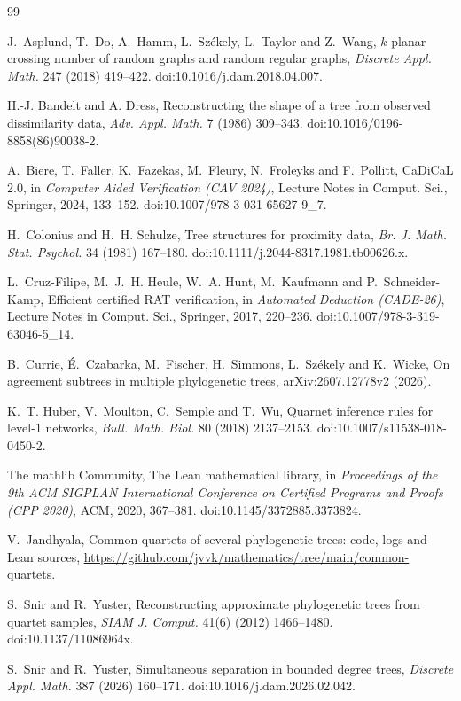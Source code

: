 \documentclass[11pt]{amsart}
\theoremstyle{definition}
\begin{document}
\begin{thebibliography}{99}

 J.~Asplund, T.~Do, A.~Hamm, L.~Sz\'ekely, L.~Taylor and Z.~Wang, $k$-planar crossing number of
random graphs and random regular graphs, \emph{Discrete Appl. Math.} 247 (2018) 419--422.
doi:10.1016/j.dam.2018.04.007.

 H.-J. Bandelt and A. Dress, Reconstructing the shape of a tree from observed dissimilarity data,
\emph{Adv. Appl. Math.} 7 (1986) 309--343. doi:10.1016/0196-8858(86)90038-2.

 A.~Biere, T.~Faller, K.~Fazekas, M.~Fleury, N.~Froleyks and F.~Pollitt, CaDiCaL 2.0, in
\emph{Computer Aided Verification (CAV 2024)}, Lecture Notes in Comput. Sci., Springer, 2024, 133--152.
doi:10.1007/978-3-031-65627-9\_7.

 H.~Colonius and H.~H. Schulze, Tree structures for proximity data, \emph{Br. J. Math. Stat. Psychol.}
34 (1981) 167--180. doi:10.1111/j.2044-8317.1981.tb00626.x.

 L.~Cruz-Filipe, M.~J.~H. Heule, W.~A. Hunt, M.~Kaufmann and P.~Schneider-Kamp, Efficient certified
RAT verification, in \emph{Automated Deduction (CADE-26)}, Lecture Notes in Comput. Sci., Springer, 2017, 220--236.
doi:10.1007/978-3-319-63046-5\_14.

 B.~Currie, \'E.~Czabarka, M.~Fischer, H.~Simmons, L.~Sz\'ekely and K.~Wicke, On agreement subtrees
in multiple phylogenetic trees, arXiv:2607.12778v2 (2026).

 K.~T. Huber, V.~Moulton, C.~Semple and T.~Wu, Quarnet inference rules for level-1 networks,
\emph{Bull. Math. Biol.} 80 (2018) 2137--2153. doi:10.1007/s11538-018-0450-2.

 The mathlib Community, The Lean mathematical library, in \emph{Proceedings of the 9th ACM SIGPLAN
International Conference on Certified Programs and Proofs (CPP 2020)}, ACM, 2020, 367--381.
doi:10.1145/3372885.3373824.

 V.~Jandhyala, Common quartets of several phylogenetic trees: code, logs and Lean sources,
\url{https://github.com/jvvk/mathematics/tree/main/common-quartets}.

 S.~Snir and R.~Yuster, Reconstructing approximate phylogenetic trees from quartet samples,
\emph{SIAM J. Comput.} 41(6) (2012) 1466--1480. doi:10.1137/11086964x.

 S.~Snir and R.~Yuster, Simultaneous separation in bounded degree trees, \emph{Discrete Appl. Math.} 387
(2026) 160--171. doi:10.1016/j.dam.2026.02.042.


\end{thebibliography}
\end{document}
